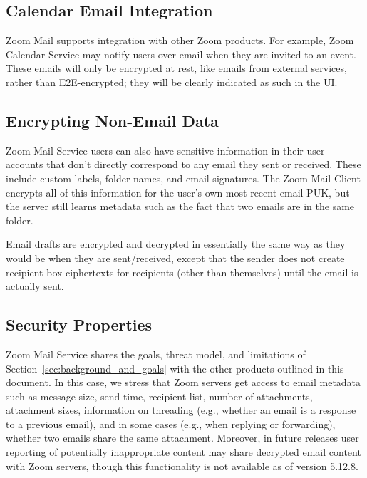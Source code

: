 \subsection{Calendar Email Integration}

Zoom Mail supports integration with other Zoom products. For example, Zoom Calendar Service may
notify users over email when they are invited to an event. These emails will only be encrypted at
rest, like emails from external services, rather than E2E-encrypted; they will be clearly indicated
as such in the UI.

\subsection{Encrypting Non-Email Data}

Zoom Mail Service users can also have sensitive information in their user accounts that don't
directly correspond to any email they sent or received. These include custom labels, folder names,
and email signatures. The Zoom Mail Client encrypts all of this information for the user's own most
recent email PUK, but the server still learns metadata such as the fact that two emails are in the
same folder.

Email drafts are encrypted and decrypted in essentially the same way as they would be when they are
sent/received, except that the sender does not create recipient box ciphertexts for recipients
(other than themselves) until the email is actually sent.

\subsection{Security Properties}

Zoom Mail Service shares the goals, threat model, and limitations of
Section~\ref{sec:background_and_goals} with the other products outlined in this document. In this
case, we stress that Zoom servers get access to email metadata such as message size, send time,
recipient list, number of attachments, attachment sizes, information on threading (e.g., whether an
email is a response to a previous email), and in some cases (e.g., when replying or forwarding),
whether two emails share the same attachment. Moreover, in future releases user reporting of
potentially inappropriate content may share decrypted email content with Zoom servers, though this
functionality is not available as of version 5.12.8.

